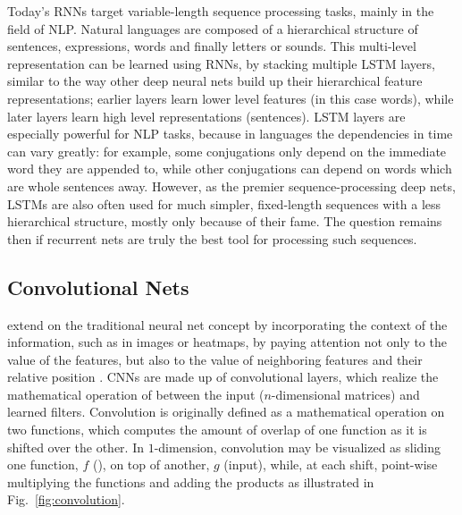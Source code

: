 			Today’s \acp{RNN} target variable-length sequence processing tasks, mainly in the field of \ac{NLP}.		
			Natural languages are composed of a hierarchical structure of sentences, expressions, words and finally letters or sounds. 
			This multi-level representation can be learned using \acp{RNN}, by stacking multiple \ac{LSTM} layers, similar to the way other deep neural nets build up their hierarchical feature representations; earlier layers learn lower level features (in this case words), while later layers learn high level representations (sentences).
			\ac{LSTM} layers are especially powerful for \ac{NLP} tasks, because in languages the dependencies in time can vary greatly: for example, some conjugations only depend on the immediate word they are appended to, while other conjugations can depend on words which are whole sentences away.
			However, as the premier sequence-processing deep nets, \acp{LSTM} are also often used for much simpler, fixed-length sequences with a less hierarchical structure, mostly only because of their fame.
			The question remains then if recurrent nets are truly the best tool for processing such sequences.		
	
		\subsection{Convolutional Nets}
			\label{cha:deep_learning:sec:convolutional_nets}
		
			 extend on the traditional neural net concept by incorporating the  context of the information, such as in images or heatmaps, by paying attention not only to the value of the features, but also to the value of neighboring features and their relative position \cite{cnn}.
			\acp{CNN} are made up of convolutional layers, which realize the mathematical operation of  between the input  ($n$-dimensional matrices) and learned filters.
			Convolution is originally defined as a mathematical operation on two functions, which computes the amount of overlap of one function as it is shifted over the other.
			In $1$-dimension, convolution may be visualized as sliding one function, $f$ (), on top of another, $g$ (input), while, at each shift, point-wise multiplying the functions and adding the products as illustrated in Fig.~\ref{fig:convolution}.
			
